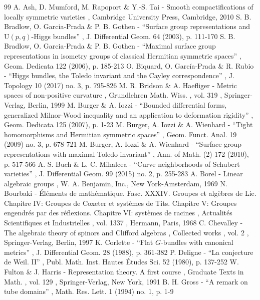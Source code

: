 \begin{thebibliography}{99}
 A. Ash, D. Mumford, M. Rapoport \& Y.-S. Tai - Smooth compactifications of locally symmetric varieties , Cambridge University Press, Cambridge, 2010
 S. B. Bradlow, O. Garcia-Prada \& P. B. Gothen - “Surface group representations and $\mathrm{U}(p,q)$-Higgs bundles” , J. Differential Geom. 64 (2003), p. 111-170
 S. B. Bradlow, O. Garcia-Prada \& P. B. Gothen - “Maximal surface group representations in isometry groups of classical Hermitian symmetric spaces” , Geom. Dedicata 122 (2006), p. 185-213
 O. Biquard, O. García-Prada \& R. Rubio - “Higgs bundles, the Toledo invariant and the Cayley correspondence” , J. Topology 10 (2017) no. 3, p. 795-826
 M. R. Bridson \& A. Haefliger - Metric spaces of non-positive curvature , Grundlehren Math. Wiss. , vol. 319 , Springer-Verlag, Berlin, 1999
 M. Burger \& A. Iozzi - “Bounded differential forms, generalized Milnor-Wood inequality and an application to deformation rigidity” , Geom. Dedicata 125 (2007), p. 1-23
 M. Burger, A. Iozzi \& A. Wienhard - “Tight homomorphisms and Hermitian symmetric spaces” , Geom. Funct. Anal. 19 (2009) no. 3, p. 678-721
 M. Burger, A. Iozzi \& A. Wienhard - “Surface group representations with maximal Toledo invariant” , Ann. of Math. (2) 172 (2010), p. 517-566
 A. S. Buch \& L. C. Mihalcea - “Curve neighborhoods of Schubert varieties” , J. Differential Geom. 99 (2015) no. 2, p. 255-283
 A. Borel - Linear algebraic groups , W. A. Benjamin, Inc., New York-Amsterdam, 1969
 N. Bourbaki - Éléments de mathématique. Fasc. XXXIV. Groupes et algèbres de Lie. Chapitre IV: Groupes de Coxeter et systèmes de Tits. Chapitre V: Groupes engendrés par des réflexions. Chapitre VI: systèmes de racines , Actualités Scientifiques et Industrielles , vol. 1337 , Hermann, Paris, 1968
 C. Chevalley - The algebraic theory of spinors and Clifford algebras , Collected works , vol. 2 , Springer-Verlag, Berlin, 1997
 K. Corlette - “Flat $G$-bundles with canonical metrics” , J. Differential Geom. 28 (1988), p. 361-382
 P. Deligne - “La conjecture de Weil. II” , Publ. Math. Inst. Hautes Études Sci. 52 (1980), p. 137-252
 W. Fulton \& J. Harris - Representation theory. A first course , Graduate Texts in Math. , vol. 129 , Springer-Verlag, New York, 1991
 B. H. Gross - “A remark on tube domains” , Math. Res. Lett. 1 (1994) no. 1, p. 1-9

\end{thebibliography}
